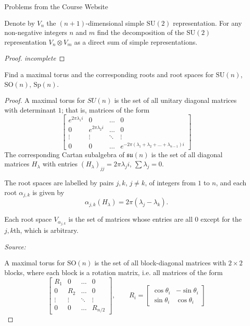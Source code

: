 \documentclass[12pt]{article}
\theoremstyle{definition}
\newenvironment{problem}[2][Problem]{\begin{trivlist}
\item[\hskip \labelsep {\bfseries #1}\hskip \labelsep {\bfseries #2.}]}{\end{trivlist}}
\begin{document}
\begin{section}{Problems from the Course Website}
	\begin{problem}{1}
		Denote by $V_n$ the $(n+1)$-dimensional simple $\text{SU}(2)$ representation. For any non-negative integers $n$ and $m$ find the decomposition of the $\text{SU}(2)$ representation $V_n \otimes V_m$ as a direct sum of simple representations.
		\begin{proof}
			\textit{incomplete}
		\end{proof}
	\end{problem}
	\begin{problem}{2}
		Find a maximal torus and the corresponding roots and root spaces for $\text{SU}(n)$, $\text{SO}(n)$, $\text{Sp}(n)$.
		\begin{proof}
			A maximal torus for $SU(n)$ is the set of all unitary diagonal matrices with determinant $1$; that is, matrices of the form
			\[\begin{bmatrix}
					e^{2\pi \lambda_1 i} & 0 & \dots & 0\\
					0 & e^{2 \pi \lambda_{2} i} & \dots & 0\\
					\vdots & \vdots & \ddots & \vdots \\
					0 & 0 & \dots & e^{-2\pi (\lambda_1 + \lambda_2 + \dots + \lambda_{n-1})i }
		\end{bmatrix}\]
		The corresponding Cartan subalgebra of $\mathfrak{su}(n)$ is the set of all diagonal matrices $H_\lambda$ with entries $(H_\lambda)_{jj} = 2\pi \lambda_j i$, $\sum \lambda_j = 0$. 
		\par The root spaces are labelled by pairs $j, k$, $j \neq k$, of integers from $1$ to $n$, and each root $\alpha_{j, k}$ is given by 
		\[\alpha_{j, k}(H_\lambda) = 2\pi (\lambda_j - \lambda_k).\]
		\par Each root space $V_{\alpha_{j, k}}$ is the set of matrices whose entries are all $0$ except for the $j, k$th, which is arbitrary.
		\par \textit{Source: }\cite{woit}
		\par A maximal torus for $\text{SO}(n)$ is the set of all block-diagonal matrices with $2\times 2$ blocks, where each block is a rotation matrix, i.e. all matrices of the form
		\[\begin{bmatrix}
				R_1 & 0 & \dots & 0\\
				0 & R_2 & \dots & 0\\
				\vdots & \vdots & \ddots & \vdots \\
				0 & 0 & \dots & R_{n/2}\end{bmatrix}, \qquad R_i = \begin{bmatrix}
					\cos \theta_i & -\sin \theta_i\\
					\sin \theta_i & \cos \theta_i
				

\end{bmatrix}\]
\end{proof}
\end{problem}
\end{section}
\end{document}
